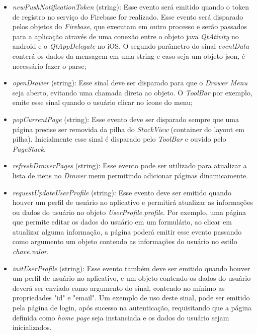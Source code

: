 \begin{itemize}
\begin{itemize}
		\item \textit{newPushNotificationToken} (string): Esse evento será emitido quando o token de registro no serviço do Firebase for realizado. Esse evento será disparado pelos objetos do \textit{Firebase}, que executam em outro processo e serão passados para a aplicação através de uma conexão entre o objeto java \textit{QtAtivity} no android e o \textit{QtAppDelegate} no iOS. O segundo parâmetro do sinal \textit{eventData} conterá os dados da mensagem em uma string e caso seja um objeto json, é necessário fazer o parse;

		\item \textit{openDrawer} (string): Esse sinal deve ser disparado para que o \textit{Drawer Menu} seja aberto, evitando uma chamada direta ao objeto. O \textit{ToolBar} por exemplo, emite esse sinal quando o usuário clicar no ícone do menu;

		\item \textit{popCurrentPage} (string): Esse evento deve ser disparado sempre que uma página precise ser removida da pilha do \textit{StackView} (container do layout em pilha). Inicialmente esse sinal é disparado pelo \textit{ToolBar} e ouvido pelo \textit{PageStack}.

		\item \textit{refreshDrawerPages} (string): Esse evento pode ser utilizado para atualizar a lista de itens no \textit{Drawer} menu permitindo adicionar páginas dinamicamente.

		\item \textit{requestUpdateUserProfile} (string): Esse evento deve ser emitido quando houver um perfil de usuário no aplicativo e permitirá atualizar as informações ou dados do usuário no objeto \textit{UserProfile.profile}. Por exemplo, uma página que permite editar os dados do usuário em um formulário, ao clicar em atualizar alguma informação, a página poderá emitir esse evento passando como argumento um objeto contendo as informações do usuário no estilo \textit{chave.valor}.

		\item \textit{initUserProfile} (string): Esse evento também deve ser emitido quando houver um perfil de usuário no aplicativo, e um objeto contendo os dados do usuário deverá ser enviado como argumento do sinal, contendo no mínimo as propriedades "id" e "email". Um exemplo de uso deste sinal, pode ser emitido pela página de login, após sucesso na autenticação, requisitando que a página definida como \textit{home page} seja instanciada e os dados do usuário sejam inicializados.


\end{itemize}
\end{itemize}
